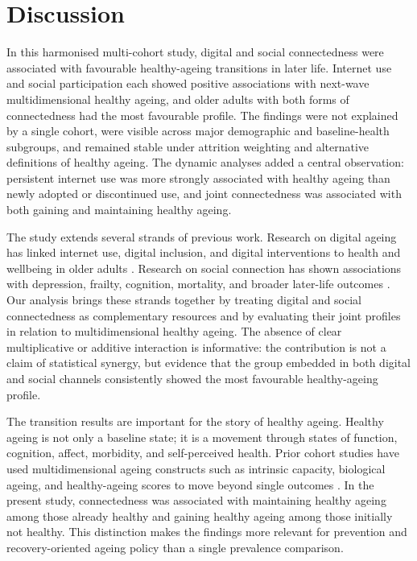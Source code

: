 \documentclass[pdflatex,sn-nature]{sn-jnl}
\begin{document}
\section{Discussion}

In this harmonised multi-cohort study, digital and social connectedness were associated with favourable healthy-ageing transitions in later life. Internet use and social participation each showed positive associations with next-wave multidimensional healthy ageing, and older adults with both forms of connectedness had the most favourable profile. The findings were not explained by a single cohort, were visible across major demographic and baseline-health subgroups, and remained stable under attrition weighting and alternative definitions of healthy ageing. The dynamic analyses added a central observation: persistent internet use was more strongly associated with healthy ageing than newly adopted or discontinued use, and joint connectedness was associated with both gaining and maintaining healthy ageing.

The study extends several strands of previous work. Research on digital ageing has linked internet use, digital inclusion, and digital interventions to health and wellbeing in older adults \cite{li2025tenyear,luo2024positive,chen2023digital,riadi2022digital}. Research on social connection has shown associations with depression, frailty, cognition, mortality, and broader later-life outcomes \cite{santini2020social,davies2021longitudinal,samtani2022associations,elovainio2017contribution,stafford2024social}. Our analysis brings these strands together by treating digital and social connectedness as complementary resources and by evaluating their joint profiles in relation to multidimensional healthy ageing. The absence of clear multiplicative or additive interaction is informative: the contribution is not a claim of statistical synergy, but evidence that the group embedded in both digital and social channels consistently showed the most favourable healthy-ageing profile.

The transition results are important for the story of healthy ageing. Healthy ageing is not only a baseline state; it is a movement through states of function, cognition, affect, morbidity, and self-perceived health. Prior cohort studies have used multidimensional ageing constructs such as intrinsic capacity, biological ageing, and healthy-ageing scores to move beyond single outcomes \cite{li2026intrinsic,beard2024cohort,mikkola2023healthy,fried2021physical}. In the present study, connectedness was associated with maintaining healthy ageing among those already healthy and gaining healthy ageing among those initially not healthy. This distinction makes the findings more relevant for prevention and recovery-oriented ageing policy than a single prevalence comparison.
\end{document}
